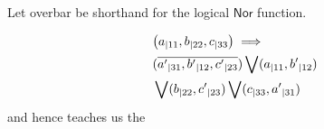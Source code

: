 Let overbar be shorthand for the logical $\mathsf{Nor}$ function.


\begin{align}\begin{split}
&\parens*{a_{|11},b_{|22},c_{|33}}\implies\\& \parens{\overline{{a'}_{|31},{b'}_{|12},{c'}_{|23}}} \bigvee \parens{a_{|11},{b'}_{|12}} \\&\bigvee \parens{b_{|22},{c'}_{|23}} \bigvee \parens{c_{|33},{a'}_{|31}}
\end{split}\end{align}
and hence teaches us the 





















